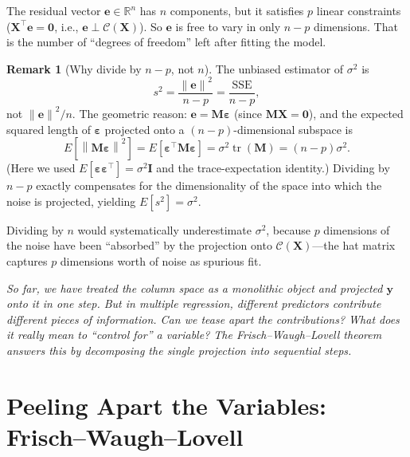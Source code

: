 \documentclass[11pt,a4paper]{article}
\theoremstyle{plain}
\theoremstyle{definition}
\newtheorem{remark}[theorem]{Remark}
\newcommand{\R}{\mathbb{R}}
\newcommand{\bX}{\bm{X}}
\newcommand{\by}{\bm{y}}
\newcommand{\be}{\bm{e}}
\newcommand{\bM}{\bm{M}}
\newcommand{\bI}{\bm{I}}
\newcommand{\Col}{\mathcal{C}}
\newcommand{\norm}[1]{\left\lVert #1 \right\rVert}
\DeclareMathOperator{\tr}{tr}
\begin{document}
The residual vector $\be\in\R^n$ has $n$ components, but it satisfies $p$
linear constraints ($\bX^\top\be = \bm{0}$, i.e., $\be\perp\Col(\bX)$).
So $\be$ is free to vary in only $n - p$ dimensions.
That is the number of ``degrees of freedom'' left after fitting the model.

\begin{remark}[Why divide by $n-p$, not $n$]
The unbiased estimator of $\sigma^2$ is
\[
  s^2 = \frac{\norm{\be}^2}{n - p} = \frac{\text{SSE}}{n-p},
\]
not $\norm{\be}^2/n$.  The geometric reason: $\be = \bM\bm{\varepsilon}$
(since $\bM\bX = \bm{0}$), and the expected squared length of
$\bm{\varepsilon}$ projected onto a $(n-p)$-dimensional subspace is
\[
  E[\norm{\bM\bm{\varepsilon}}^2]
  = E[\bm{\varepsilon}^\top\bM\bm{\varepsilon}]
  = \sigma^2\tr(\bM)
  = (n-p)\sigma^2.
\]
(Here we used $E[\bm{\varepsilon}\bm{\varepsilon}^\top] = \sigma^2\bI$
and the trace-expectation identity.)
Dividing by $n-p$ exactly compensates for the dimensionality of the
space into which the noise is projected, yielding $E[s^2] = \sigma^2$.

Dividing by $n$ would systematically underestimate $\sigma^2$, because
$p$ dimensions of the noise have been ``absorbed'' by the projection
onto $\Col(\bX)$---the hat matrix captures $p$ dimensions worth of noise
as spurious fit.
\end{remark}

\medskip
\noindent\textit{So far, we have treated the column space as a monolithic
object and projected $\by$ onto it in one step.
But in multiple regression, different predictors contribute different
pieces of information.
Can we tease apart the contributions?
What does it really mean to ``control for'' a variable?
The Frisch--Waugh--Lovell theorem answers this by decomposing the
single projection into sequential steps.}


\section{Peeling Apart the Variables: Frisch--Waugh--Lovell}\label{sec:fwl}
\end{document}
